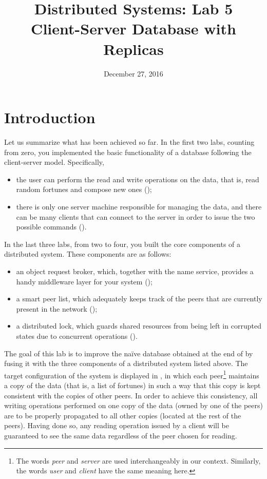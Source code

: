 \documentclass[a4paper]{article}
\title{%
  Distributed Systems: Lab 5\\%
  Client-Server Database with Replicas%
}
\author{}
\date{December 27, 2016}
\begin{document}
\maketitle

\section{Introduction}

Let us summarize what has been achieved so far. In the first two labs, counting
from zero, you implemented the basic functionality of a database following the
client-server model. Specifically,
\begin{itemize}

  \item the user can perform the read and write operations on the data, that is,
  read random fortunes and compose new ones ();

  \item there is only one server machine responsible for managing the data, and
  there can be many clients that can connect to the server in order to issue the
  two possible commands ().

\end{itemize}
In the last three labs, from two to four, you built the core components of a
distributed system. These components are as follows:
\begin{itemize}

  \item an object request broker, which, together with the name service,
  provides a handy middleware layer for your system ();

  \item a smart peer list, which adequately keeps track of the peers that are
  currently present in the network ();

  \item a distributed lock, which guards shared resources from being left in
  corrupted states due to concurrent operations ().

\end{itemize}
The goal of this lab is to improve the na\"{i}ve database obtained at the end of
 by fusing it with the three components of a distributed system listed
above. The target configuration of the system is displayed in
, in which each peer\footnote{The words \emph{peer}
and \emph{server} are used interchangeably in our context. Similarly, the words
\emph{user} and \emph{client} have the same meaning here.} maintains a copy of
the data (that is, a list of fortunes) in such a way that this copy is kept
consistent with the copies of other peers. In order to achieve this consistency,
all writing operations performed on one copy of the data (owned by one of the
peers) are to be properly propagated to all other copies (located at the rest of
the peers). Having done so, any reading operation issued by a client will be
guaranteed to see the same data regardless of the peer chosen for reading.
\end{document}

